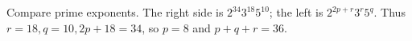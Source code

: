 Compare prime exponents. The right side is $2^{34}3^{18}5^{10}$; the left is $2^{2p+r}3^r5^q$. Thus $r=18,q=10,2p+18=34$, so $p=8$ and $\boxed{p+q+r=36}$.
